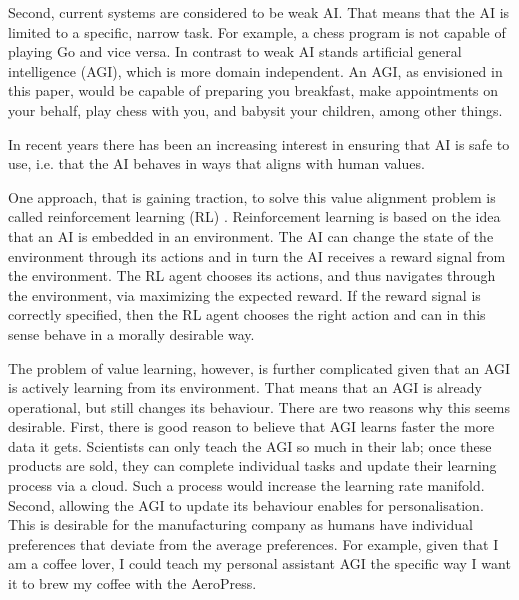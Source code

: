 Second, current systems are considered to be weak AI. That means that the AI is limited to a specific, narrow task. For example, a chess program is not capable of playing Go and vice versa. In contrast to weak AI stands artificial general intelligence (AGI), which is more domain independent. An AGI, as envisioned in this paper, would be capable of preparing you breakfast, make appointments on your behalf, play chess with you, and babysit your children, among other things. 

In recent years there has been an increasing interest in ensuring that AI is safe to use, i.e. that the AI behaves in ways that aligns with human values.

One approach, that is gaining traction, to solve this value alignment problem is called reinforcement learning (RL) \citep{soares2015value}. Reinforcement learning is based on the idea that an AI is embedded in an environment. The AI can change the state of the environment through its actions and in turn the AI receives a reward signal from the environment. The RL agent chooses its actions, and thus navigates through the environment, via maximizing the expected reward. If the reward signal is correctly specified, then the RL agent chooses the right action and can in this sense behave in a morally desirable way.

The problem of value learning, however, is further complicated given that an AGI is actively learning from its environment. That means that an AGI is already operational, but still changes its behaviour. There are two reasons why this seems desirable. First, there is good reason to believe that AGI learns faster the more data it gets. Scientists can only teach the AGI so much in their lab; once these products are sold, they can complete individual tasks and update their learning process via a cloud. Such a process would increase the learning rate manifold. Second, allowing the AGI to update its behaviour enables for personalisation. This is desirable for the manufacturing company as humans have individual preferences that deviate from the average preferences. For example, given that I am a coffee lover, I could teach my personal assistant AGI the specific way I want it to brew my coffee with the AeroPress.  


